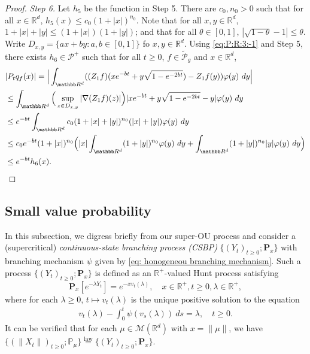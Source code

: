 \documentclass[EJP]{ejpecp} %
\begin{document}
\begin{proof}
  \emph{Step 6.}
  Let $h_5$ be the function in Step 5.
  There are $c_0, n_0> 0$ such that for all $x\in \mathbb R^d$, $h_5(x) \leq c_0(1+|x|)^{n_0}$.
  Note that for all $x, y \in \mathbb R^d$, $1+|x|+|y|\leq (1+|x|) (1+|y|)$; and that for all $\theta \in [0,1]$, $|\sqrt {1 - \theta} - 1| \leq \theta$.
  Write $D_{x,y} = \{ax+by: a, b \in [0,1]\}$ fo $x, y \in \mathbb R^d$.
  Using \eqref{eq:P:R:3:-1} and Step 5, there exists  $h_6 \in \mathcal P^+$ such that for all $t \geq 0$, $f \in \widetilde {\mathcal P}_g$ and $x \in \mathbb R^d$,
  \begin{align}
    & |P_t q_f(x)|
      = \Big| \int_{\mathbb R^d} ( (Z_1f)(x e^{-bt}+ y \sqrt{1 - e^{-2bt}}) - Z_1 f (y) ) \varphi(y) ~dy \Big| \\
    & \leq \int_{\mathbb R^d} \Big(\sup_{z\in D_{x,y}} |\nabla  (Z_1f) (z) |\Big) | x e^{-bt} + y \sqrt{1 - e^{-2bt}} - y | \varphi(y) ~dy \\
    & \leq e^{-bt} \int_{\mathbb R^d} c_0(1+|x|+|y|)^{n_0} (|x|+|y|) \varphi(y) ~dy \\
    & \leq c_0 e^{-bt}(1+|x|)^{n_0}\Big(|x|\int_{\mathbb R^d} (1+|y|)^{n_0}\varphi(y) ~dy + \int_{\mathbb R^d} (1+ |y|)^{n_0} |y| \varphi(y) ~dy \Big) \\
    & \leq e^{-bt} h_6(x).
      \qedhere
  \end{align}
\end{proof}

\subsection{Small value probability}
\label{sec: Small value probability}
In this subsection, we digress briefly from our super-OU process and consider a (supercritical) \emph{continuous-state branching process (CSBP)} $\{(Y_t)_{t\geq 0}; \mathbf P_x\}$ with branching mechanism $\psi$ given by \eqref{eq: honogeneou branching mechanism}.
Such a process $\{(Y_t)_{t\geq 0}; \mathbf P_x\}$ is defined as an $\mathbb R^+$-valued Hunt process satisfying
\[
  \mathbf P_x[e^{-\lambda Y_t}] = e^{- x v_t(\lambda)},
  \quad x\in \mathbb R^+, t\geq 0, \lambda \in \mathbb R^+,
\]
where for each $\lambda\geq 0$, $t\mapsto v_t(\lambda)$ is the unique positive solution to the equation
\begin{align}
  \label{eq: fkpp equation for CSBP}
  v_t(\lambda) - \int_0^t \psi(v_s(\lambda))~ds = \lambda,
  \quad t\geq 0.
\end{align}
It can be verified that for each $\mu \in \mathcal M(\mathbb R^d)$ with $x = \| \mu \|$, we have $ \{(\|X_t\|)_{t\geq 0}; \mathbb P_\mu\} \overset{\text{law}}{=} \{(Y_t)_{t\geq 0}; \mathbf P_x\}$.
\end{document}
